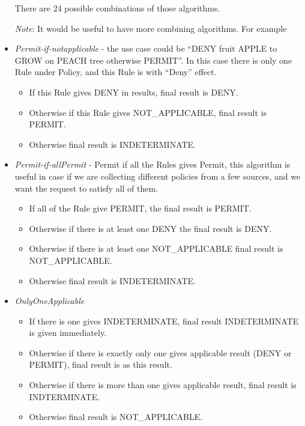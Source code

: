 \documentclass{article}                            %
\begin{document}
\begin{itemize}
    There are 24 possible combinations of those algorithms.

\emph{Note}: It would be useful to have more combining algorithms. For example

    \item  \emph{Permit-if-notapplicable} - the use case could be ``DENY fruit APPLE to GROW on PEACH tree otherwise PERMIT''. In this case there is only one Rule under Policy, and this Rule is with ``Deny'' effect.

    \begin{itemize}
        \item If this Rule gives DENY in results, final result is DENY.
        \item Otherwise if this Rule gives NOT\_APPLICABLE, final result is PERMIT.
        \item Otherwise final result is INDETERMINATE.
    \end{itemize}

    \item  \emph{Permit-if-allPermit} - Permit if all the Rules gives Permit, this algorithm is useful in case if we are collecting different policies from a few sources, and we want the request to satisfy all of them.

    \begin{itemize}
        \item If all of the Rule give PERMIT, the final result is PERMIT.
        \item Otherwise if there is at least one DENY the final result is DENY.
        \item Otherwise if there is at least one NOT\_APPLICABLE final result is NOT\_APPLICABLE.
        \item Otherwise final result is INDETERMINATE.
    \end{itemize}

    \item  \emph{OnlyOneApplicable}

    \begin{itemize}
        \item If there is one gives INDETERMINATE, final result INDETERMINATE is given immediately.
        \item Otherwise if there is exactly only one gives applicable result (DENY or PERMIT), final result is as this result.
        \item Otherwise if there is more than one gives applicable result, final result is INDTERMINATE.
        \item Otherwise final result is NOT\_APPLICABLE.
    \end{itemize}


\end{itemize}
\end{document}

